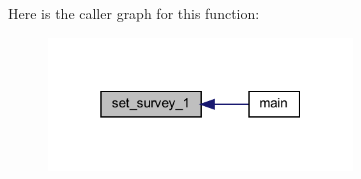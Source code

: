 Here is the caller graph for this function\+:\nopagebreak
\begin{figure}[H]
\begin{center}
\leavevmode
\includegraphics[width=229pt]{Leroi_8f90_a27012846f79c1bc36d500442dad45d7c_icgraph}
\end{center}
\end{figure}
\mbox{\label{Leroi_8f90_a8b4a76899e2dcc9f323ef19f765d6679}} 
